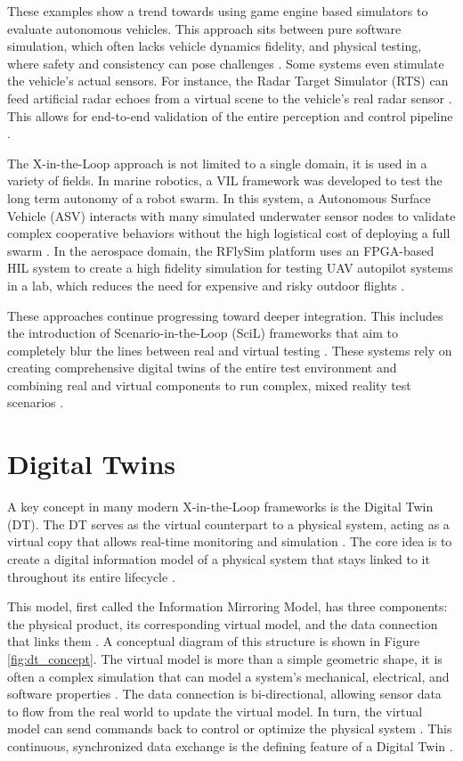 These examples show a trend towards using game engine based simulators to evaluate autonomous vehicles. This approach sits between pure software simulation, which often lacks vehicle dynamics fidelity, and physical testing, where safety and consistency can pose challenges \cite{Cao2023}. Some systems even stimulate the vehicle’s actual sensors. For instance, the Radar Target Simulator (RTS) can feed artificial radar echoes from a virtual scene to the vehicle's real radar sensor \cite{Diewald2021}. This allows for end-to-end validation of the entire perception and control pipeline \cite{Diewald2021}.

The X-in-the-Loop approach is not limited to a single domain, it is used in a variety of fields. In marine robotics, a VIL framework was developed to test the long term autonomy of a robot swarm. In this system, a Autonomous Surface Vehicle (ASV) interacts with many simulated underwater sensor nodes to validate complex cooperative behaviors without the high logistical cost of deploying a full swarm \cite{Babic2020}. In the aerospace domain, the RFlySim platform uses an FPGA-based HIL system to create a high fidelity simulation for testing UAV autopilot systems in a lab, which reduces the need for expensive and risky outdoor flights \cite{Dai2021}.

These approaches continue progressing toward deeper integration. This includes the introduction of Scenario-in-the-Loop (SciL) frameworks that aim to completely blur the lines between real and virtual testing \cite{Szalay2021}. These systems rely on creating comprehensive digital twins of the entire test environment and combining real and virtual components to run complex, mixed reality test scenarios \cite{Szalay2021}.

\section{Digital Twins}
\label{sec:DT}
A key concept in many modern X-in-the-Loop frameworks is the Digital Twin (DT). The DT serves as the virtual counterpart to a physical system, acting as a virtual copy that allows real-time monitoring and simulation \cite{AA23}. The core idea is to create a digital information model of a physical system that stays linked to it throughout its entire lifecycle \cite{Grieves2017}.

This model, first called the Information Mirroring Model, has three components: the physical product, its corresponding virtual model, and the data connection that links them \cite{Grieves2017, AA23}. A conceptual diagram of this structure is shown in Figure \ref{fig:dt_concept}. The virtual model is more than a simple geometric shape, it is often a complex simulation that can model a system's mechanical, electrical, and software properties \cite{Leng2021}. The data connection is bi-directional, allowing sensor data to flow from the real world to update the virtual model. In turn, the virtual model can send commands back to control or optimize the physical system \cite{Grieves2017, Leng2021}. This continuous, synchronized data exchange is the defining feature of a Digital Twin \cite{AA23}.

